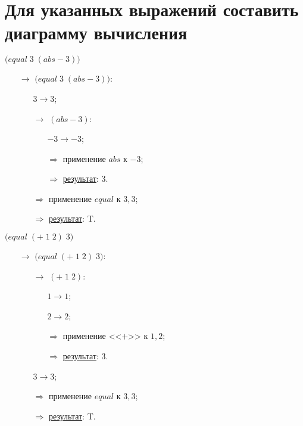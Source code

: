 
\section{Для указанных выражений составить диаграмму вычисления}

\vfill
\problem $\bigl(equal\; 3\; (abs -\!3)\bigr)$

\begin{itemize}
	\item[$\longrightarrow$]$\bigl(equal\; 3\; (abs -\!3)\bigr)$:
	\begin{itemize}
		\item[\textbullet] $3 \to 3$;
		\item[$\longrightarrow$] $(abs -\!3)$:
		\begin{itemize}
			\item[\textbullet] $-3 \to -3$;
			\item[$\Longrightarrow$] применение $abs$ к $-3$;
			\item[$\Longrightarrow$] \underline{результат}: $3$.
		\end{itemize}
		\item[$\Longrightarrow$] применение $equal$ к $3, 3$;
		\item[$\Longrightarrow$] \underline{результат}: T.
	\end{itemize}
\end{itemize}
\vfill


\problem $\bigl(equal\; (+\; 1\; 2)\; 3\bigr)$

\begin{itemize}
	\item[$\longrightarrow$] $\bigl(equal\; (+\; 1\; 2)\; 3\bigr)$:
	\begin{itemize}
		\item[$\longrightarrow$] $(+\; 1\; 2)$:
		\begin{itemize}
			\item[\textbullet] $1 \to 1$;
			\item[\textbullet] $2 \to 2$;
			\item[$\Longrightarrow$] применение <<$+$>> к $1, 2$;
			\item[$\Longrightarrow$] \underline{результат}: $3$.
		\end{itemize}
		\item[\textbullet] $3 \to 3$;
		\item[$\Longrightarrow$] применение $equal$ к $3, 3$;
		\item[$\Longrightarrow$] \underline{результат}: T.
	\end{itemize}
\end{itemize}
\vfill


